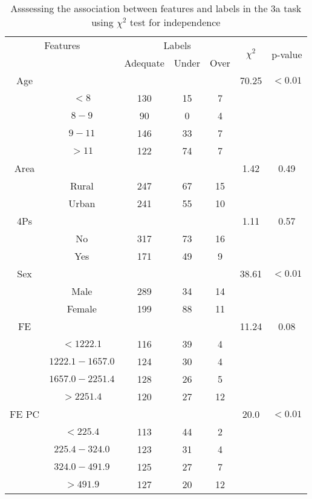 \begin{table}[!htb]
\centering
\caption{Asssessing the association between features and labels in the 3a task using $\chi^2$ test for independence}
\label{tab:chitest_3a}
\begin{tabular}{c c | c c c| c | c}
\hline
\multicolumn{2}{c|}{Features}& \multicolumn{3}{c|}{Labels}& \multirow{2}{*}{$\chi^2$} & \multirow{2}{*}{p-value}\\ 
& & Adequate & Under & Over & & \\ 
\hline
Age &  &  &  & & 70.25 & $< 0.01$ \\ 
& $< 8$ & 130 & 15 & 7& & \\ 
& $8-9$ & 90 & 0 & 4& & \\ 
& $9-11$ & 146 & 33 & 7& & \\ 
& $> 11$ & 122 & 74 & 7& & \\ 
\hline 
Area &  &  &  & & 1.42 & 0.49 \\ 
& Rural & 247 & 67 & 15& & \\ 
& Urban & 241 & 55 & 10& & \\ 
\hline 
4Ps &  &  &  & & 1.11 & 0.57 \\ 
& No & 317 & 73 & 16& & \\ 
& Yes & 171 & 49 & 9& & \\ 
\hline 
Sex &  &  &  & & 38.61 & $< 0.01$ \\ 
& Male & 289 & 34 & 14& & \\ 
& Female & 199 & 88 & 11& & \\ 
\hline 
FE &  &  &  & & 11.24 & 0.08 \\ 
& $< 1222.1$ & 116 & 39 & 4& & \\ 
& $1222.1-1657.0$ & 124 & 30 & 4& & \\ 
& $1657.0-2251.4$ & 128 & 26 & 5& & \\ 
& $> 2251.4$ & 120 & 27 & 12& & \\ 
\hline 
FE PC &  &  &  & & 20.0 & $< 0.01$ \\ 
& $< 225.4$ & 113 & 44 & 2& & \\ 
& $225.4-324.0$ & 123 & 31 & 4& & \\ 
& $324.0-491.9$ & 125 & 27 & 7& & \\ 
& $> 491.9$ & 127 & 20 & 12& & \\ 
\hline 
\end{tabular}
\end{table}
